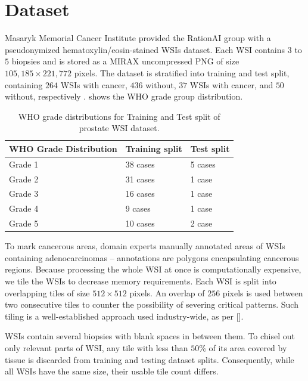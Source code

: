 \section{Dataset}\label{sec:dataset}
Masaryk Memorial Cancer Institute provided the RationAI group with a pseudonymized hematoxylin/eosin-stained WSIs dataset.
Each WSI contains $3$ to $5$ biopsies and is stored as a MIRAX uncompressed PNG of size $105,185 \times 221,772$ pixels.
The dataset is stratified into training and test split, containing $264$ WSIs with cancer, $436$ without, $37$ WSIs with cancer, and $50$ without, respectively \cite{gallo}.
 shows the WHO grade group distribution.
\begin{table}
\centering
{}
\begin{tabular}{@{} l l l @{}}\toprule
WHO Grade Distribution & Training split & Test split \\ 
\midrule
Grade 1         & 38 cases            & 5 cases      \\
Grade 2         & 31 cases            & 1 case       \\
Grade 3         & 16 cases            & 1 case       \\
Grade 4         & 9 cases             & 1 case       \\
Grade 5         & 10 cases            & 2 case       \\
\bottomrule
\end{tabular}
\caption{WHO grade distributions for Training and Test split of prostate WSI dataset.}
\label{tab:who_grade_distribution}
\end{table}

To mark cancerous areas, domain experts manually annotated areas of WSIs containing adenocarcinomas -- annotations are polygons encapsulating cancerous regions.
Because processing the whole WSI at once is computationally expensive, we tile the WSIs to decrease memory requirements.
Each WSI is split into overlapping tiles of size $512 \times 512$ pixels.
An overlap of $256$ pixels is used between two consecutive tiles to counter the possibility of severing critical patterns.
Such tiling is a well-established approach used industry-wide, as per [].

WSIs contain several biopsies with blank spaces in between them.
To chisel out only relevant parts of WSI, any tile with less than $50$\% of its area covered by tissue is discarded from training and testing dataset splits.
Consequently, while all WSIs have the same size, their usable tile count differs.

